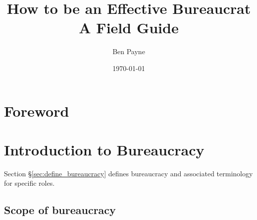 \documentclass{book}
\title{How to be an Effective Bureaucrat\\
A Field Guide}
\author{Ben Payne}
\date{\today}
\begin{document}

\begin{titlepage}
\maketitle
\thispagestyle{empty}
\end{titlepage}
\newpage

\frontmatter %

\clearpage

\chapter*{Foreword}%

\hypertarget{contents}{}
\tableofcontents

\mainmatter %


\chapter{Introduction to Bureaucracy}

Section \S\ref{sec:define_bureaucracy} defines bureaucracy and associated terminology for specific roles.

  \newpage %
  
  \newpage %
  \section{Scope of bureaucracy}

\end{document}
